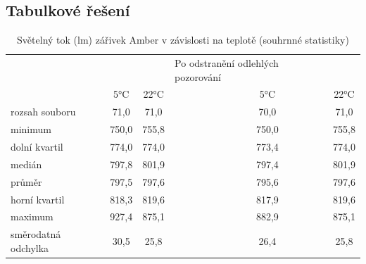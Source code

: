 \documentclass[czech]{article}%
\begin{document}
\subsection{Tabulkové řešení}
\noindent
\begin{table}[H]
	\centering
	\caption{Světelný tok (lm) zářivek Amber v závislosti na teplotě (souhrnné statistiky)}
	\label{tab:statAmber}
	\begin{tabular}{lccl|cc}
        \hline
        \rowcolor[HTML]{F2F2F2} 
        \multicolumn{2}{l}{\cellcolor[HTML]{F2F2F2}Světelný tok zářivek Amber (lm)} & & & \multicolumn{2}{l}{\cellcolor[HTML]{F2F2F2}Po   odstranění odlehlých pozorování} \\
        \rowcolor[HTML]{F2F2F2} 
        \hline
        & 5°C             & 22°C             && 5°C                                    & 22°C                                    \\
        \hline
        rozsah souboru           & 71,0                        & 71,0                         &  & 70,0                                   & 71,0                                    \\
        minimum                  & 750,0                       & 755,8                        &  & 750,0                                  & 755,8                                   \\
        dolní kvartil            & 774,0                       & 774,0                        &  & 773,4                                  & 774,0                                   \\
        medián                   & 797,8                       & 801,9                        &  & 797,4                                  & 801,9                                   \\
        průměr                   & 797,5                       & 797,6                        &  & 795,6                                  & 797,6                                   \\
        horní kvartil            & 818,3                       & 819,6                        &  & 817,9                                  & 819,6                                   \\
        maximum                  & 927,4                       & 875,1                        &  & 882,9                                  & 875,1                                   \\
        směrodatná odchylka      & 30,5                        & 25,8                         &  & 26,4                                   & 25,8                                    \\

\end{tabular}
\end{table}
\end{document}
